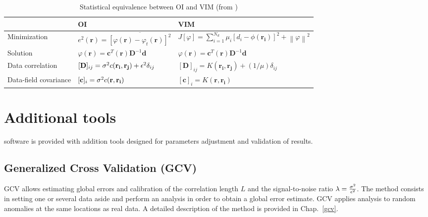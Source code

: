 \begin{table}[H]
\begin{flushleft}
\caption{Statistical equivalence between OI and VIM (from \cite{RIXEN00})\label{tabOAVIM}}
\begin{tabular}{lll}
\hline
											&		OI																																										  	&VIM \\
											\hline
Minimization \rule{0pt}{3ex}& $e^{2}(\mathbf{r})= \overline{ [\varphi(\mathbf{r})-\varphi_{t}(\mathbf{r})]^{2}}$					& $J[\varphi]=\sum_{i=1}^{N_d}\mu_{i}[d_{i}-\phi(\mathbf{r_{i}})]^{2}+\left\|\varphi\right\|^{2}$\\
Solution							& $\varphi(\mathbf{r})= \mathbf{c}^{T}(\mathbf{r})\mathbf{D}^{-1}\mathbf{d}$								& $\varphi(\mathbf{r})= \mathbf{c}^{T}(\mathbf{r})\mathbf{D}^{-1}\mathbf{d}$	\\
Data correlation			& $[\mathbf{D}]_{ij}=\sigma^{2} c(\mathbf{r_{i}},\mathbf{r_{j}})+\epsilon^{2}\delta_{ij}$	& $[\mathbf{D}]_{ij}=K(\mathbf{r_i},\mathbf{r_j})+(1/\mu)\delta_{ij}$\\
Data-field covariance & $[\mathbf{c}]_{i}=\sigma^{2} c(\mathbf{r},\mathbf{r_{i}})$																						& $[\mathbf{c}]_{i}=K(\mathbf{r},\mathbf{r_{i}})$	\\
\hline
\end{tabular}
\end{flushleft}
\end{table}


 
 
 
 
 
 
 

\section{Additional tools}

\diva software is provided with addition tools designed for parameters adjustment and validation of results.


\subsection{Generalized Cross Validation (GCV)\label{firsttool}}

GCV allows estimating global errors and calibration of the correlation length $L$ and the signal-to-noise ratio $\lambda=\frac{\sigma^{2}}{\epsilon^{2}}$.
The method consists in setting one or several data aside and perform an analysis in order to obtain a global error estimate. GCV applies analysis to random anomalies at the same locations as real data. A detailed description of the method is provided in Chap.~\ref{gcv}.

